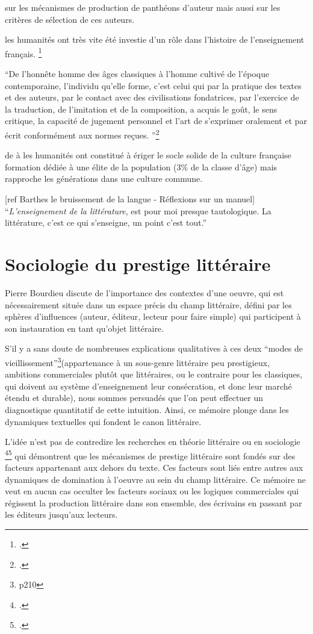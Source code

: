 sur les mécanismes de production de panthéons d'auteur mais aussi sur les critères de sélection de ces auteurs. 


les humanités ont très vite été investie d'un rôle dans l'histoire de l'enseignement français. 
\footcites{chervel_histoire_1993}

\enquote{De l'honnête homme des âges classiques à l'homme cultivé de l'époque contemporaine, l'individu qu'elle forme, c'est celui qui par la pratique des textes et des auteurs, par le contact avec des civilisations fondatrices, par l'exercice de la traduction, de l'imitation et de la composition, a acquis le goût, le sens critique, la capacité de jugement personnel et l'art de s'exprimer oralement et par écrit conformément aux normes reçues. }\footcites{compere_les_1997}

de à les humanités ont constitué à ériger le socle solide de la culture française formation dédiée à une élite de la population (3\% de la classe d'âge) mais rapproche les générations dans une culture commune. 

[ref Barthes le bruissement de la langue - Réflexions sur un manuel]
\enquote{\textit{L'enseignement de la littérature}, est pour moi presque tautologique. La littérature, c'est ce qui s'enseigne, un point c'est tout.}


\section{Sociologie du prestige littéraire}

Pierre Bourdieu discute de l'importance des contextes d'une oeuvre, qui est nécessairement située dans un espace précis du champ littéraire, défini par les sphères d'influences (auteur, éditeur, lecteur pour faire simple) qui participent à son instauration en tant qu'objet littéraire. 

S'il y a sans doute de nombreuses explications qualitatives à ces deux \enquote{modes de vieillissement}\footnote{\cite{bourdieu_les_1992} p210}(appartenance à un sous-genre littéraire peu prestigieux, ambitions commerciales plutôt que littéraires, ou le contraire pour les classiques, qui doivent au système d'enseignement leur consécration, et donc leur marché étendu et durable), nous sommes persuadés que l'on peut effectuer un diagnostique quantitatif de cette intuition. Ainsi, ce mémoire plonge dans les dynamiques textuelles qui fondent le canon littéraire.

L'idée n'est pas de contredire les recherches en théorie littéraire ou en sociologie \footcites{bourdieu_distinction_2012}\footcites{bourdieu_les_1992} qui démontrent que les mécanismes de prestige littéraire sont fondés sur des facteurs appartenant aux dehors du texte. Ces facteurs sont liés entre autres aux dynamiques de domination à l'oeuvre au sein du champ littéraire. Ce mémoire ne veut en aucun cas occulter les facteurs sociaux ou les logiques commerciales qui régissent la production littéraire dans son ensemble, des écrivains en passant par les éditeurs jusqu'aux lecteurs. 

